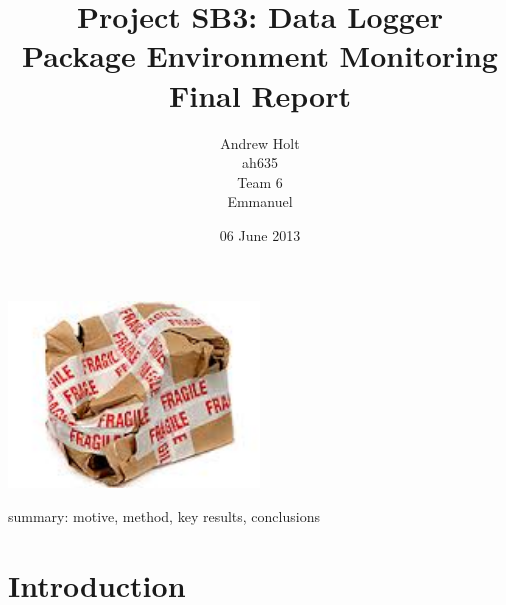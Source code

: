 \documentclass[a4paper,10pt]{article}  %
\title{Project SB3: Data Logger\\
       Package Environment Monitoring\\
       Final Report}
\author{Andrew Holt\\
        ah635\\
        Team 6\\
        Emmanuel}
\date{06 June 2013}
\begin{document}
\listoftodos

\maketitle


\begin{center}
  \includegraphics[width=0.5\textwidth]{damaged_parcel.jpg}
\end{center}


\noindent summary: motive, method, key results, conclusions 

\newpage

\tableofcontents
\listoffigures
\listoftables

\newpage

\section{Introduction}
\label{sec:introduction}
\end{document}
